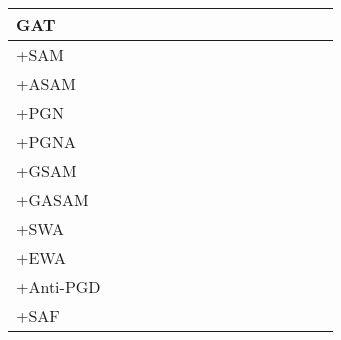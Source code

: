 \documentclass[runningheads]{llncs}
\newcommand\good[1]{\textcolor{forestgreen}{#1}}
\newcommand\bad[1]{\textcolor{red}{#1}}
\begin{document}
\begin{table*}[!ht]
{\begin{tabular}{l|r r r | r r r | r r r | r r | r r | r}
 
 \hline 
\midrule

  GAT &  &  &  &  &  &  &  &  &  &  &  &  &  & \\
  \hline
 +SAM & \bad{} & \bad{} & \good{} & \good{} & \bad{} & \good{} & \good{} & \good{} & \bad{} & \bad{} & \good{} & \bad{} & \good{} & \bad{} \\
 +ASAM & \bad{} & \bad{} & \good{} & \bad{} & \bad{} & \bad{} & \bad{} & \bad{} & \bad{} &  \bad{} & \good{} & \bad{} & \good{} & \bad{} \\
 +PGN & \good{} & \bad{} & \good{} & \good{} & \good{} & \good{} & \good{} & \good{} & \good{} & \good{} & \good{} & \good{} & \good{} & \bad{} \\
 +PGNA & \good{} & \bad{} & \good{} & \bad{} & \good{} & \good{} & \good{} & \good{} & \bad{} & \bad{} & \good{} & \good{} & \good{} & \bad{} \\
 +GSAM & \good{} & \bad{} & \good{} & \good{} & \bad{} & \good{} & \good{} & \good{} & \good{} & \bad{} & \good{} & \bad{} & \good{} &  \bad{} \\
 +GASAM & \bad{} & \good{} & \bad{} & \bad{} & \bad{} & \good{} & \good{} & \good{} & \good{} & \bad{} & \good{} & \bad{} & \good{} &  \bad{} \\
 \hline
 +SWA & \bad{} & \bad{} & \good{} & \bad{} & \good{} & \good{} & \bad{} & \bad{} & \bad{} & \bad{} & \good{} & \good{} & \good{} & \bad{} \\
 +EWA & \bad{} & \bad{} & \bad{} & \bad{} & \good{} & \good{} & \bad{} & \bad{} & \good{} & \bad{} & \good{} & \good{} & \good{} & \bad{} \\
  \hline
 +Anti-PGD & \good{} & \bad{} & \good{} & \good{} & \good{} & \bad{} & \good{} & \good{} & \good{} & \bad{} & \good{} & \good{} & \good{} & \bad{} \\
 +SAF & \bad{} & \bad{} & \bad{} & \bad{} & \bad{} & \bad{} & \good{} & \bad{} & \bad{} & \good{} & \good{} & \good{} & \bad{} & \good{} \\
  \hline
 

\end{tabular}}
\end{table*}
\end{document}
